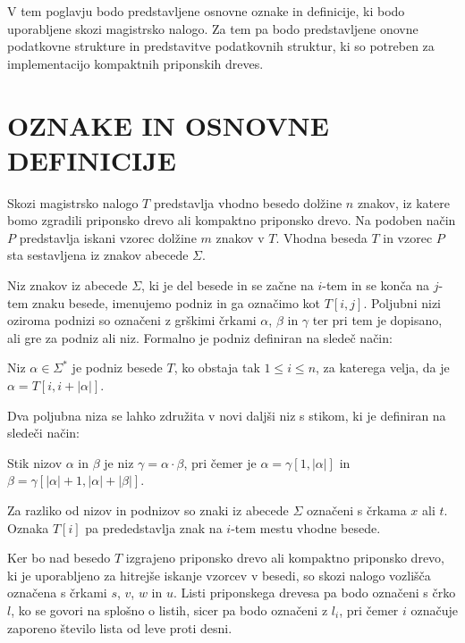 
V tem poglavju bodo predstavljene osnovne oznake in definicije, ki bodo uporabljene skozi magistrsko nalogo. Za tem pa bodo predstavljene onovne podatkovne strukture in predstavitve podatkovnih struktur, ki so potreben za implementacijo kompaktnih priponskih dreves.


\section{OZNAKE IN OSNOVNE DEFINICIJE}\label{sec:def}
Skozi magistrsko nalogo $T$ predstavlja vhodno besedo dolžine $n$ znakov, iz katere bomo zgradili priponsko drevo ali kompaktno priponsko drevo. Na podoben način $P$ predstavlja iskani vzorec dolžine $m$ znakov v $T$. Vhodna beseda $T$ in vzorec $P$ sta sestavljena iz znakov abecede $\Sigma$.

Niz znakov iz abecede $\Sigma$, ki je del besede in se začne na $i$-tem in se konča na $j$-tem znaku besede, imenujemo podniz in ga označimo kot $T[i,j]$. Poljubni nizi oziroma podnizi so označeni z grškimi črkami $\alpha$, $\beta$ in $\gamma$ ter pri tem je dopisano, ali gre za podniz ali niz. Formalno je podniz definiran na sledeč način:
\begin{defi}
    Niz $\alpha\in\Sigma^*$ je podniz besede $T$, ko obstaja tak $1\le i\le n$, za katerega velja, da je  $\alpha=T[i,i+|\alpha|]$. 
\end{defi}
Dva poljubna niza se lahko združita v novi daljši niz s stikom, ki je definiran na sledeči način:
\begin{defi}
    Stik nizov $\alpha$ in $\beta$ je niz $\gamma=\alpha\cdot\beta$, pri čemer je $\alpha=\gamma[1,|\alpha|]$ in $\beta=\gamma[|\alpha|+1,|\alpha|+|\beta|]$.
\end{defi}

Za razliko od nizov in podnizov so znaki iz abecede $\Sigma$ označeni s črkama $x$ ali $t$. Oznaka $T[i]$ pa prededstavlja znak na $i$-tem mestu vhodne besede.

Ker bo nad besedo $T$ izgrajeno priponsko drevo ali kompaktno priponsko drevo, ki je uporabljeno za hitrejše iskanje vzorcev v besedi, so skozi nalogo vozlišča označena s črkami $s$, $v$, $w$ in $u$. Listi priponskega drevesa pa bodo označeni s črko $l$, ko se govori na splošno o listih, sicer pa bodo označeni z $l_i$, pri čemer $i$ označuje zaporeno število lista od leve proti desni.

